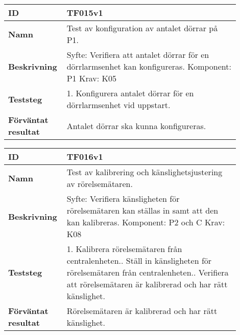 \newpage

\begin{table}[h!]
\begin{tabular}{| p{0.18\linewidth} | p{0.72\linewidth} |}
\hline
\textbf{ID} & TF015v1 \\ \hline
\textbf{Namn} & 
Test av konfiguration av antalet dörrar på P1.
\\ \hline
\textbf{Beskrivning} &
Syfte: Verifiera att antalet dörrar för en dörrlarmsenhet kan konfigureras.\newline
Komponent: P1\newline
Krav: K05
\\ \hline
\textbf{Teststeg} &
1. Konfigurera antalet dörrar för en dörrlarmsenhet vid uppstart.
\\ \hline
\textbf{Förväntat resultat} & Antalet dörrar ska kunna konfigureras.
\\ \hline
\end{tabular}
\end{table}

\begin{table}[h!]
\begin{tabular}{| p{0.18\linewidth} | p{0.72\linewidth} |}
\hline
\textbf{ID} & TF016v1 \\ \hline
\textbf{Namn} & 
Test av kalibrering och känslighetsjustering av rörelsemätaren.
\\ \hline
\textbf{Beskrivning} &
Syfte: Verifiera känsligheten för rörelsemätaren kan ställas in samt att den kan kalibreras.\newline
Komponent: P2 och C\newline
Krav: K08
\\ \hline
\textbf{Teststeg} &
1. Kalibrera rörelsemätaren från centralenheten.\newline
2. Ställ in känsligheten för rörelsemätaren från centralenheten.\newline
3. Verifiera att rörelsemätaren är kalibrerad och har rätt känslighet.
\\ \hline
\textbf{Förväntat resultat} & Rörelsemätaren är kalibrerad och har rätt känslighet.
\\ \hline
\end{tabular}
\end{table}

